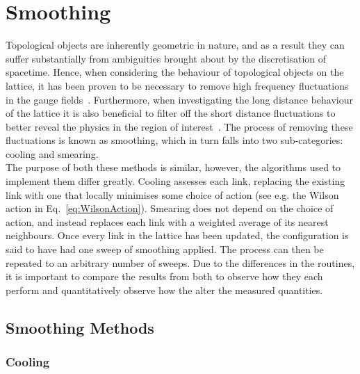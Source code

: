 
\chapter{Smoothing}
\ifpdf
    \graphicspath{{Chapter5/Figs/Raster/}{Chapter5/Figs/PDF/}{Chapter5/Figs/}}
\else
    \graphicspath{{Chapter5/Figs/Vector/}{Chapter5/Figs/}}
\fi
Topological objects are inherently geometric in nature, and as a result they can suffer substantially from ambiguities brought about by the discretisation of spacetime. Hence, when considering the behaviour of topological objects on the lattice, it has been proven to be necessary to remove high frequency fluctuations in the gauge fields~\cite{Bonnet:2000dc}. Furthermore, when investigating the long distance behaviour of the lattice it is also beneficial to filter off the short distance fluctuations to better reveal the physics in the region of interest~\cite{Moran:2008ra}. The process of removing these fluctuations is known as smoothing, which in turn falls into two sub-categories: cooling and smearing.\\

The purpose of both these methods is similar, however, the algorithms used to implement them differ greatly. Cooling assesses each link, replacing the existing link with one that locally minimises some choice of action (see e.g. the Wilson action in Eq.~\ref{eq:WilsonAction}). Smearing does not depend on the choice of action, and instead replaces each link with a weighted average of its nearest neighbours. Once every link in the lattice has been updated, the configuration is said to have had one sweep of smoothing applied. The process can then be repeated to an arbitrary number of sweeps.  Due to the differences in the routines, it is important to compare the results from both to observe how they each perform and quantitatively observe how the alter the measured quantities.

\section{Smoothing Methods}
\subsection{Cooling}
